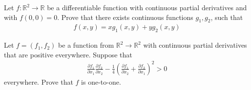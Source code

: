 \documentclass{article}
\begin{document}
\begin{exercise}
    Let $f: \mathbb{R}^2 \rightarrow \mathbb{R}$ be a differentiable function with continuous partial derivatives and with $f(0,0) = 0$. Prove that there exists continuous functions $g_1, g_2$, such that 
    \begin{align*} 
        f(x,y) = xg_1(x,y) + yg_2(x,y)
    \end{align*}
\end{exercise}

\begin{exercise}[2018 B5]
    Let $f = (f_1, f_2)$ be a function from $\mathbb{R}^2 \rightarrow \mathbb{R}^2$ with continuous partial derivatives that are positive everywhere. Suppose that 
    \begin{align*} 
        \frac{\partial f_1}{\partial x_1} \frac{\partial f_2}{\partial x_2} - \frac{1}{4} \left(\frac{\partial f_1}{\partial x_2} + \frac{\partial f_2}{\partial x_1}\right)^2 > 0
    \end{align*}
    everywhere. Prove that $f$ is one-to-one.
\end{exercise} 
\end{document}
